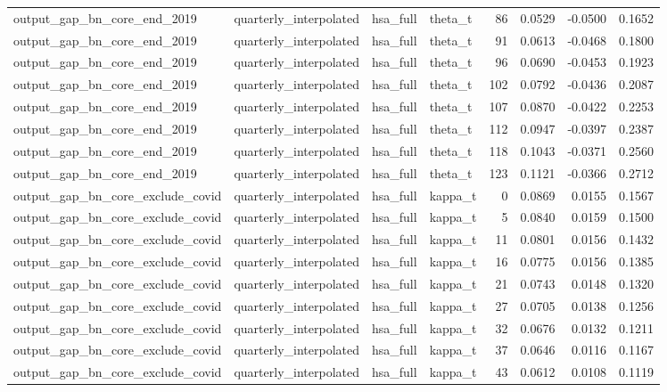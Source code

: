 \begin{tabular}{llllrrrr}
output\_gap\_bn\_core\_end\_2019 & quarterly\_interpolated & hsa\_full & theta\_t & 86 & 0.0529 & -0.0500 & 0.1652 \\
output\_gap\_bn\_core\_end\_2019 & quarterly\_interpolated & hsa\_full & theta\_t & 91 & 0.0613 & -0.0468 & 0.1800 \\
output\_gap\_bn\_core\_end\_2019 & quarterly\_interpolated & hsa\_full & theta\_t & 96 & 0.0690 & -0.0453 & 0.1923 \\
output\_gap\_bn\_core\_end\_2019 & quarterly\_interpolated & hsa\_full & theta\_t & 102 & 0.0792 & -0.0436 & 0.2087 \\
output\_gap\_bn\_core\_end\_2019 & quarterly\_interpolated & hsa\_full & theta\_t & 107 & 0.0870 & -0.0422 & 0.2253 \\
output\_gap\_bn\_core\_end\_2019 & quarterly\_interpolated & hsa\_full & theta\_t & 112 & 0.0947 & -0.0397 & 0.2387 \\
output\_gap\_bn\_core\_end\_2019 & quarterly\_interpolated & hsa\_full & theta\_t & 118 & 0.1043 & -0.0371 & 0.2560 \\
output\_gap\_bn\_core\_end\_2019 & quarterly\_interpolated & hsa\_full & theta\_t & 123 & 0.1121 & -0.0366 & 0.2712 \\
output\_gap\_bn\_core\_exclude\_covid & quarterly\_interpolated & hsa\_full & kappa\_t & 0 & 0.0869 & 0.0155 & 0.1567 \\
output\_gap\_bn\_core\_exclude\_covid & quarterly\_interpolated & hsa\_full & kappa\_t & 5 & 0.0840 & 0.0159 & 0.1500 \\
output\_gap\_bn\_core\_exclude\_covid & quarterly\_interpolated & hsa\_full & kappa\_t & 11 & 0.0801 & 0.0156 & 0.1432 \\
output\_gap\_bn\_core\_exclude\_covid & quarterly\_interpolated & hsa\_full & kappa\_t & 16 & 0.0775 & 0.0156 & 0.1385 \\
output\_gap\_bn\_core\_exclude\_covid & quarterly\_interpolated & hsa\_full & kappa\_t & 21 & 0.0743 & 0.0148 & 0.1320 \\
output\_gap\_bn\_core\_exclude\_covid & quarterly\_interpolated & hsa\_full & kappa\_t & 27 & 0.0705 & 0.0138 & 0.1256 \\
output\_gap\_bn\_core\_exclude\_covid & quarterly\_interpolated & hsa\_full & kappa\_t & 32 & 0.0676 & 0.0132 & 0.1211 \\
output\_gap\_bn\_core\_exclude\_covid & quarterly\_interpolated & hsa\_full & kappa\_t & 37 & 0.0646 & 0.0116 & 0.1167 \\
output\_gap\_bn\_core\_exclude\_covid & quarterly\_interpolated & hsa\_full & kappa\_t & 43 & 0.0612 & 0.0108 & 0.1119 \\

\end{tabular}
